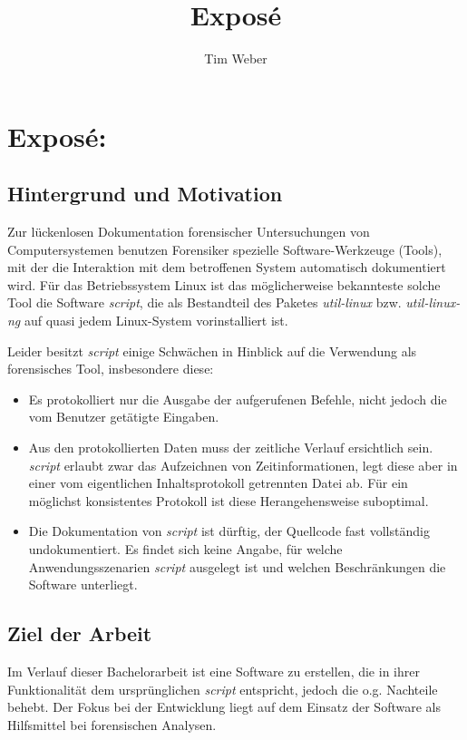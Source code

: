 
\pagestyle{empty}

\author{Tim Weber}
\title{Exposé}

\section*{Exposé:}
\subsection*{Hintergrund und Motivation}
Zur lückenlosen Dokumentation forensischer Untersuchungen von Computersystemen benutzen Forensiker spezielle Software-Werkzeuge (Tools), mit der die Interaktion mit dem betroffenen System automatisch dokumentiert wird.
Für das Betriebssystem Linux ist das möglicherweise bekannteste solche Tool die Software \emph{script}, die als Bestandteil des Paketes \emph{util-linux} bzw. \emph{util-linux-ng} auf quasi jedem Linux-System vorinstalliert ist.

Leider besitzt \emph{script} einige Schwächen in Hinblick auf die Verwendung als forensisches Tool, insbesondere diese:
\begin{itemize}
\item Es protokolliert nur die Ausgabe der aufgerufenen Befehle, nicht jedoch die vom Benutzer getätigte Eingaben.
\item Aus den protokollierten Daten muss der zeitliche Verlauf ersichtlich sein. \emph{script} erlaubt zwar das Aufzeichnen von Zeitinformationen, legt diese aber in einer vom eigentlichen Inhaltsprotokoll getrennten Datei ab. Für ein möglichst konsistentes Protokoll ist diese Herangehensweise suboptimal.
\item Die Dokumentation von \emph{script} ist dürftig, der Quellcode fast vollständig undokumentiert. Es findet sich keine Angabe, für welche Anwendungsszenarien \emph{script} ausgelegt ist und welchen Beschränkungen die Software unterliegt.
\end{itemize}

\subsection*{Ziel der Arbeit}
Im Verlauf dieser Bachelorarbeit ist eine Software zu erstellen, die in ihrer Funktionalität dem ursprünglichen \emph{script} entspricht, jedoch die o.g. Nachteile behebt.
Der Fokus bei der Entwicklung liegt auf dem Einsatz der Software als Hilfsmittel bei forensischen Analysen.

